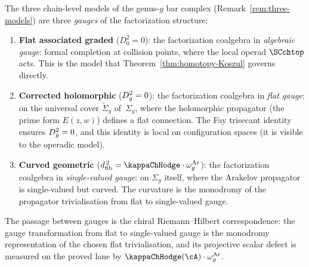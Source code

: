 \begin{corollary}
\label{cor:three-models-from-fact}
The three chain-level models of the genus-$g$ bar complex
\textup{(}Remark~\textup{\ref{rem:three-models})} are three
\emph{gauges} of the factorization structure:
\begin{enumerate}[label=\textup{(\roman*)}]
\item \textbf{Flat associated graded} ($D_0^2 = 0$): the
 factorization coalgebra in \emph{algebraic gauge}: formal
 completion at collision points, where the local operad
 $\SCchtop$ acts. This is the model that
 Theorem~\textup{\ref{thm:homotopy-Koszul}} governs directly.

\item \textbf{Corrected holomorphic} ($D_{g}^2 = 0$): the
 factorization coalgebra in \emph{flat gauge}: on the universal
 cover $\widetilde{\Sigma}_g$ of~$\Sigma_g$, where the holomorphic
 propagator (the prime form $E(z,w)$) defines a flat connection.
 The Fay trisecant identity ensures $D_{g}^2 = 0$, and this
 identity is local on configuration spaces (it is visible to the
 operadic model).

\item \textbf{Curved geometric} ($\dfib^{\,2} = \kappaChHodge \cdot
 \omega_g^{\mathrm{Ar}}$): the factorization coalgebra in \emph{single-valued
 gauge}: on $\Sigma_g$ itself, where the Arakelov propagator
 is single-valued but curved. The curvature is the monodromy of
 the propagator trivialisation from flat to single-valued gauge.
\end{enumerate}
The passage between gauges is the chiral Riemann--Hilbert
correspondence: the gauge transformation from flat to single-valued
gauge is the monodromy representation of the chosen flat
trivialisation, and its projective scalar defect is measured on the
proved lane by $\kappaChHodge(\cA) \cdot \omega_g^{\mathrm{Ar}}$.
\end{corollary}

